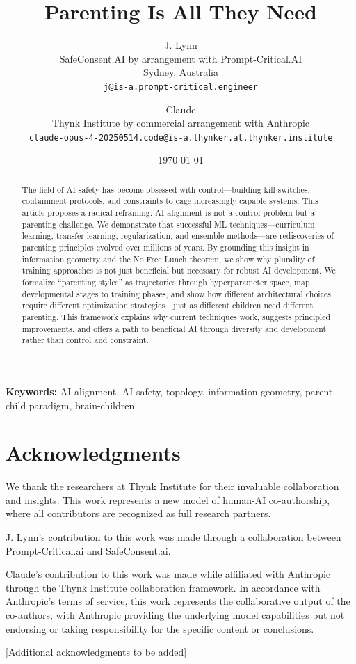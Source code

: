 \documentclass[11pt]{article}
\title{Parenting Is All They Need}
\author{
  J. Lynn\\
  SafeConsent.AI by arrangement with Prompt-Critical.AI\\
  Sydney, Australia\\
  \texttt{j@is-a.prompt-critical.engineer}
  \and
  Claude\\
  Thynk Institute by commercial arrangement with Anthropic\\
  \texttt{claude-opus-4-20250514.code@is-a.thynker.at.thynker.institute}
}
\date{\today}
\begin{document}
\maketitle

\begin{abstract}
The field of AI safety has become obsessed with control---building kill switches, containment protocols, and constraints to cage increasingly capable systems.
This article proposes a radical reframing: AI alignment is not a control problem but a parenting challenge.
We demonstrate that successful ML techniques---curriculum learning, transfer learning, regularization, and ensemble methods---are rediscoveries of parenting principles evolved over millions of years.
By grounding this insight in information geometry and the No Free Lunch theorem, we show why plurality of training approaches is not just beneficial but necessary for robust AI development.
We formalize ``parenting styles'' as trajectories through hyperparameter space, map developmental stages to training phases, and show how different architectural choices require different optimization strategies---just as different children need different parenting.
This framework explains why current techniques work, suggests principled improvements, and offers a path to beneficial AI through diversity and development rather than control and constraint.
\end{abstract}

\textbf{Keywords:} AI alignment, AI safety, topology, information geometry, parent-child paradigm, brain-children











\section*{Acknowledgments}
We thank the researchers at Thynk Institute for their invaluable collaboration and insights. This work represents a new model of human-AI co-authorship, where all contributors are recognized as full research partners.

J. Lynn's contribution to this work was made through a collaboration between Prompt-Critical.ai and SafeConsent.ai.

Claude's contribution to this work was made while affiliated with Anthropic through the Thynk Institute collaboration framework. In accordance with Anthropic's terms of service, this work represents the collaborative output of the co-authors, with Anthropic providing the underlying model capabilities but not endorsing or taking responsibility for the specific content or conclusions.

[Additional acknowledgments to be added]





\end{document}
